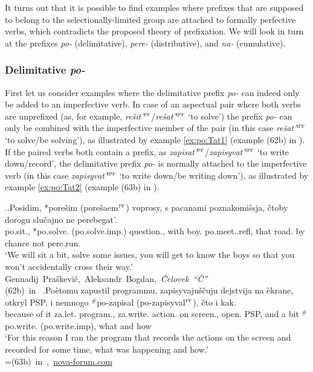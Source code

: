 It turns out that it is possible to find examples where prefixes that are supposed to belong to the selectionally-limited group are attached to formally perfective verbs, which contradicts the proposed theory of prefixation. We will look in turn at the prefixes \textit{po-} (delimitative), \textit{pere-} (distributive), and \textit{na-} (cumulative). 

\subsubsection{Delimitative \textit{po-}}
First let us consider examples where the delimitative prefix \textit{po-} can indeed only be added to an imperfective verb. In case of an aspectual pair where both verbs are unprefixed (as, for example, \textit{re\v{s}it'}$^{\textsc{pf}}$\slash\textit{re\v{s}at'}$^{\textsc{ipf}}$ `to solve') the prefix \textit{po-} can only be combined with the imperfective member of the pair (in this case \textit{re\v{s}at'}$^{\textsc{ipf}}$ `to solve/be solving'), as illustrated by example \ref{ex:po:Tat1} (example (62b) in \citealt[121]{Tatevosov:09}). If the paired verbs both contain a prefix, as \textit{zapisat'}$^{\textsc{pf}}$\slash\textit{zapisyvat'}$^{\textsc{ipf}}$ `to write down/record', the delimitative prefix \textit{po-} is normally attached to the imperfective verb (in this case \textit{zapisyvat'}$^{\textsc{ipf}}$ `to write down/be writing down'), as illustrated by example \ref{ex:po:Tat2} (example (63b) in \citealt[121]{Tatevosov:09}).

\ex.\label{ex:po:Tat}\ag.\label{ex:po:Tat1}Posidim, *pore\v{s}im (\textsuperscript{\JudgeOK}pore\v{s}aem$^{\textsc{pf}}$) voprosy, s pacanami poznakomi\v{s}sja, \v{c}toby dorogu slu\v{c}ajno ne perebegat'.\\
po.sit., *po.solve. (\textsuperscript{\JudgeOK}po.solve.imp.) question., with boy. po.meet..refl, that road. {by chance} not pere.run.\\
\trans `We will sit a bit, solve some issues, you will get to know the boys so that you won't accidentally cross their way.'\\\hbox{}\hfill\hbox{Gennadij Pra\v{s}kevi\v{c}, Aleksandr Bogdan, \textit{\v{C}elovek ``\v{C}''}}\\\hbox{}\hfill\hbox{(62b) in \citet{Tatevosov:09}}
\bg.\label{ex:po:Tat2}Po\`{e}tomu zapustil programmu, zapisyvaju\v{s}\v{c}uju dejstvija na \`{e}krane, otkryl PSP, i nemnogo $^\#$po-zapisal (\textsuperscript{\JudgeOK}po-zapisyval$^{\textsc{pf}}$), \v{c}to i kak.\\
{because of it} za.let. program., za.write. action. on screen., open. PSP, and {a bit} $^\#$po.write. (\textsuperscript{\JudgeOK}po.write.imp), what and how\\
\trans `For this reason I ran the program that records the actions on the screen and recorded for some time, what was happening and how.'\\\hbox{}\hfill\hbox{=(63b) in \citet{Tatevosov:09}, \url{nova-forum.com}}


